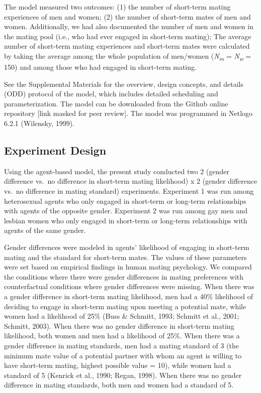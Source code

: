 \documentclass[
  11pt,
]{article}
\begin{document}
The model measured two outcomes: (1) the number of short-term mating
experiences of men and women; (2) the number of short-term mates of men
and women. Additionally, we had also documented the number of men and
women in the mating pool (i.e., who had ever engaged in short-term
mating); The average number of short-term mating experiences and
short-term mates were calculated by taking the average among the whole
population of men/women (\emph{N\textsubscript{m}} =
\emph{N\textsubscript{w}} = 150) and among those who had engaged in
short-term mating.

See the Supplemental Materials for the overview, design concepts, and
details (ODD) protocol of the model, which includes detailed scheduling
and parameterization. The model can be downloaded from the Github online
repository {[}link masked for peer review{]}. The model was programmed
in Netlogo 6.2.1 (Wilensky, 1999).

\hypertarget{experiment-design}{%
\subsection{Experiment Design}\label{experiment-design}}

Using the agent-based model, the present study conducted two 2 (gender
difference vs.~no difference in short-term mating likelihood) x 2
(gender difference vs.~no difference in mating standard) experiments.
Experiment 1 was run among heterosexual agents who only engaged in
short-term or long-term relationships with agents of the opposite
gender. Experiment 2 was run among gay men and lesbian women who only
engaged in short-term or long-term relationships with agents of the same
gender.

Gender differences were modeled in agents' likelihood of engaging in
short-term mating and the standard for short-term mates. The values of
these parameters were set based on empirical findings in human mating
psychology. We compared the conditions where there were gender
differences in mating preferences with counterfactual conditions where
gender differences were missing. When there was a gender difference in
short-term mating likelihood, men had a 40\% likelihood of deciding to
engage in short-term mating upon meeting a potential mate, while women
had a likelihood of 25\% (Buss \& Schmitt, 1993; Schmitt et al., 2001;
Schmitt, 2003). When there was no gender difference in short-term mating
likelihood, both women and men had a likelihood of 25\%. When there was
a gender difference in mating standards, men had a mating standard of 3
(the minimum mate value of a potential partner with whom an agent is
willing to have short-term mating, highest possible value = 10), while
women had a standard of 5 (Kenrick et al., 1990; Regan, 1998). When
there was no gender difference in mating standards, both men and women
had a standard of 5.
\end{document}
